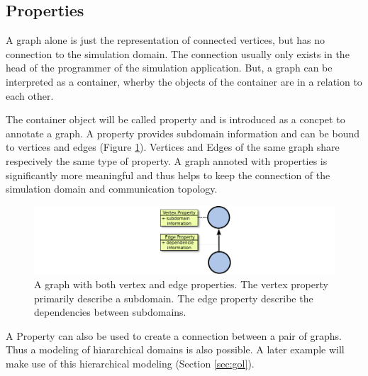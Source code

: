 \subsection{Properties}
A graph alone is just the representation of connected vertices, but
has no connection to the simulation domain. The connection usually
only exists in the head of the programmer of the simulation
application. But, a graph can be interpreted as a container, wherby the
objects of the container are in a relation to each other.

The container object will be called property and is introduced as a
concpet to annotate a graph. A property provides subdomain information
and can be bound to vertices and edges (Figure
\ref{fig:property}). Vertices and Edges of the same graph share
respecively the same type of property. A graph annoted with properties
is significantly more meaningful and thus helps to keep the connection
of the simulation domain and communication topology.

\begin{figure}[H]
  \centering \includegraphics[width=\textwidth]{graphics/30_property}
  \caption{A graph with both vertex and edge properties. The vertex
    property primarily describe a subdomain. The edge property
    describe the dependencies between subdomains.}
  \label{fig:property}
\end{figure}

A Property can also be used to create a connection between a pair of
graphs. Thus a modeling of hiararchical domains is also possible.  A
later example will make use of this hierarchical modeling (Section
\ref{sec:gol}).

